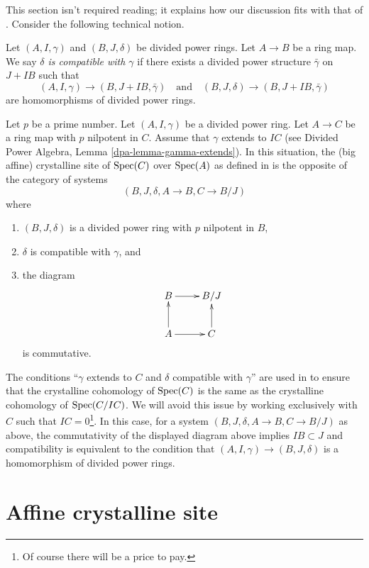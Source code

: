 \noindent
This section isn't required reading; it explains how our discussion
fits with that of \cite{Berthelot}.
Consider the following technical notion.

\begin{definition}
\label{definition-compatible}
Let $(A, I, \gamma)$ and $(B, J, \delta)$ be divided power rings.
Let $A \to B$ be a ring map. We say
{\it $\delta$ is compatible with $\gamma$}
if there exists a divided power structure $\bar\gamma$ on
$J + IB$ such that
$$
(A, I, \gamma) \to (B, J + IB, \bar \gamma)\quad\text{and}\quad
(B, J, \delta) \to (B, J + IB, \bar \gamma)
$$
are homomorphisms of divided power rings.
\end{definition}

\noindent
Let $p$ be a prime number. Let $(A, I, \gamma)$ be a divided power ring.
Let $A \to C$ be a ring map with $p$ nilpotent in $C$.
Assume that $\gamma$ extends to $IC$ (see
Divided Power Algebra, Lemma \ref{dpa-lemma-gamma-extends}).
In this situation, the (big affine) crystalline site of
$\mathop{\mathrm{Spec}}(C)$ over $\mathop{\mathrm{Spec}}(A)$
as defined in \cite{Berthelot} 
is the opposite of the category of systems
$$
(B, J, \delta, A \to B, C \to B/J)
$$
where
\begin{enumerate}
\item $(B, J, \delta)$ is a divided power ring with $p$ nilpotent in $B$,
\item $\delta$ is compatible with $\gamma$, and
\item the diagram
$$
\xymatrix{
B \ar[r] & B/J \\
A \ar[u] \ar[r] & C \ar[u]
}
$$
is commutative.
\end{enumerate}
The conditions
``$\gamma$ extends to $C$ and $\delta$ compatible with $\gamma$''
are used in \cite{Berthelot} to ensure that
the crystalline cohomology of $\mathop{\mathrm{Spec}}(C)$ is the same as the crystalline
cohomology of $\mathop{\mathrm{Spec}}(C/IC)$. We will avoid this issue
by working exclusively with $C$ such that $IC = 0$\footnote{Of course there
will be a price to pay.}. In this case,
for a system $(B, J, \delta, A \to B, C \to B/J)$ as above,
the commutativity of the displayed diagram above implies $IB \subset J$ and
compatibility is equivalent to the condition that
$(A, I, \gamma) \to (B, J, \delta)$ is a homomorphism of divided
power rings.




\section{Affine crystalline site}
\label{section-affine-site}

